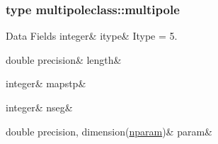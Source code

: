 \subsubsection{type multipoleclass\+::multipole}
\begin{DoxyFields}{Data Fields}
\mbox{\label{namespacemultipoleclass_a0819a9c738ccf5ddd0aa69c2a7befd2a}} 
integer&
itype&
Itype = 5. \\
\hline

\mbox{\label{namespacemultipoleclass_aa096a41e77f2a963837b3ec8d5b3324b}} 
double precision&
length&
\\
\hline

\mbox{\label{namespacemultipoleclass_a4d8dd9ec28f1f2396c1fe8634b1ffb81}} 
integer&
mapstp&
\\
\hline

\mbox{\label{namespacemultipoleclass_a7e808e5433de77a1defc9a21691400dc}} 
integer&
nseg&
\\
\hline

\mbox{\label{namespacemultipoleclass_ab06c87e37bb85347c808f7e43bd9bd1f}} 
double precision, dimension(\mbox{\hyperlink{namespacemultipoleclass_a67bb1a71461cf39cdd365adab7fec8b9}{nparam}})&
param&
\\
\hline

\end{DoxyFields}
